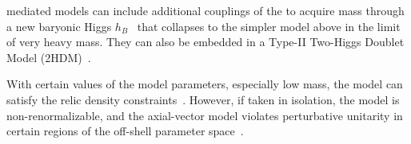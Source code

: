 
\Zprime mediated models can include additional couplings of the \Zprime to acquire mass through a new baryonic Higgs $h_B$~\cite{Berlin:2014cfa} that collapses to the simpler model above in the limit of very heavy \Zprime mass. 
They can also be embedded in a Type-II Two-Higgs Doublet Model (2HDM)~\cite{Berlin:2014cfa,Liew:2016oon}.

With certain values of the model parameters, especially low \Zprime mass,
the model can satisfy the relic density constraints~\cite{Chala:2015ama}.
However, if taken in isolation, the model is non-renormalizable, and the axial-vector
model violates perturbative unitarity in certain regions of the off-shell parameter space~\cite{Chala:2015ama,Kahlhoefer:2015bea,Boveia:2016mrp}. 



